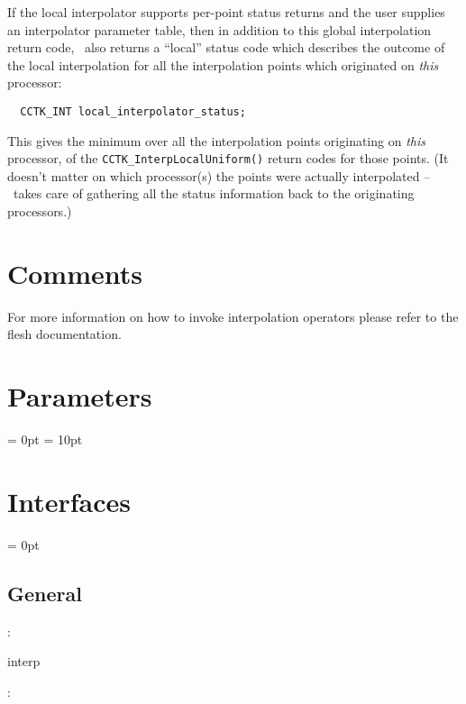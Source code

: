 \documentclass{article}
\begin{document}
If the local interpolator supports per-point status returns
and the user supplies an interpolator parameter table,
then in addition to this global interpolation return code,
\InterpGridArrays\ also returns a ``local'' status code which
describes the outcome of the local interpolation for all the
interpolation points which originated on {\em this\/} processor:
\begin{verbatim}
  CCTK_INT local_interpolator_status;
\end{verbatim}
This gives the minimum over all the interpolation points originating
on {\em this\/} processor, of the \verb|CCTK_InterpLocalUniform()|
return codes for those points.  (It doesn't matter on which processor(s)
the points were actually interpolated -- \InterpGridArrays\ takes care
of gathering all the status information back to the originating processors.)


\section{Comments}
For more information on how to invoke interpolation operators please refer
to the flesh documentation.




\section{Parameters} 


\parskip = 0pt
\parskip = 10pt 

\section{Interfaces} 


\parskip = 0pt

\vspace{3mm} \subsection*{General}

: 

interp
\vspace{2mm}

\vspace{5mm}

: 
\end{document}
